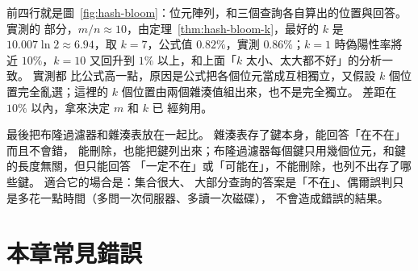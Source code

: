 
前四行就是圖~\ref{fig:hash-bloom}：位元陣列，和三個查詢各自算出的位置與回答。 實測的
部分，$m/n \approx 10$，由定理~\ref{thm:hash-bloom-k}，最好的 $k$ 是 $10.007 \ln 2
\approx 6.94$，取 $k = 7$，公式值 $0.82\%$，實測 $0.86\%$；$k = 1$ 時偽陽性率將近
$10\%$，$k = 10$ 又回升到 $1\%$ 以上，和上面「$k$ 太小、太大都不好」的分析一致。 實測都
比公式高一點，原因是公式把各個位元當成互相獨立，又假設 $k$ 個位置完全亂選；這裡的 $k$
個位置由兩個雜湊值組出來，也不是完全獨立。 差距在 $10\%$ 以內，拿來決定 $m$ 和 $k$ 已
經夠用。

最後把布隆過濾器和雜湊表放在一起比。 雜湊表存了鍵本身，能回答「在不在」而且不會錯，
能刪除，也能把鍵列出來；布隆過濾器每個鍵只用幾個位元，和鍵的長度無關，但只能回答
「一定不在」或「可能在」，不能刪除，也列不出存了哪些鍵。 適合它的場合是：集合很大、
大部分查詢的答案是「不在」、偶爾誤判只是多花一點時間（多問一次伺服器、多讀一次磁碟），
不會造成錯誤的結果。

\section{本章常見錯誤}
\label{sec:hash-pitfalls}

